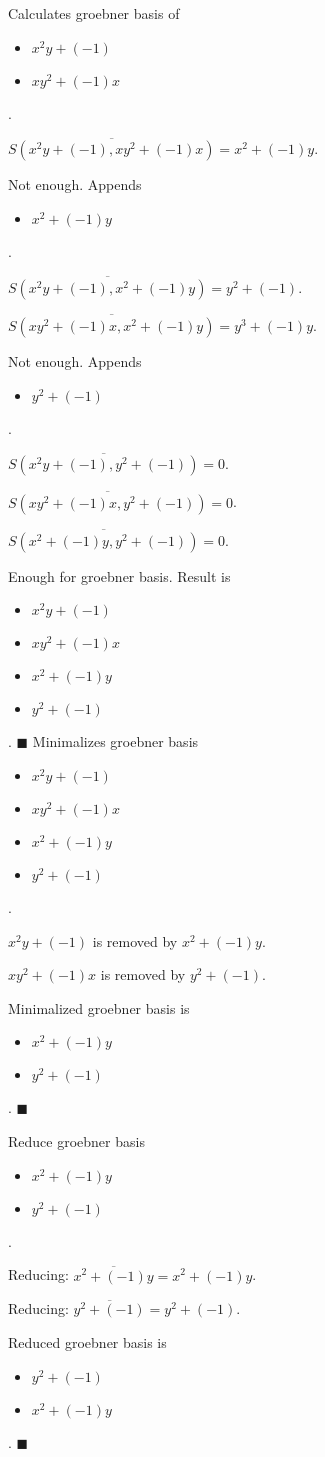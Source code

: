 Calculates groebner basis of
\begin{itemize}
\item $x^{2}y+(-1)$
\item $xy^{2}+(-1)x$
\end{itemize}  .


$\overline{S(x^{2}y+(-1), xy^{2}+(-1)x)} = x^{2}+(-1)y$.

Not enough.  Appends \begin{itemize}
\item $x^{2}+(-1)y$
\end{itemize}  .


$\overline{S(x^{2}y+(-1), x^{2}+(-1)y)} = y^{2}+(-1)$.

$\overline{S(xy^{2}+(-1)x, x^{2}+(-1)y)} = y^{3}+(-1)y$.

Not enough.  Appends \begin{itemize}
\item $y^{2}+(-1)$
\end{itemize}  .


$\overline{S(x^{2}y+(-1), y^{2}+(-1))} = 0$.

$\overline{S(xy^{2}+(-1)x, y^{2}+(-1))} = 0$.

$\overline{S(x^{2}+(-1)y, y^{2}+(-1))} = 0$.

Enough for groebner basis.  Result is \begin{itemize}
\item $x^{2}y+(-1)$
\item $xy^{2}+(-1)x$
\item $x^{2}+(-1)y$
\item $y^{2}+(-1)$
\end{itemize}  .
$\blacksquare{}$
Minimalizes groebner basis
\begin{itemize}
\item $x^{2}y+(-1)$
\item $xy^{2}+(-1)x$
\item $x^{2}+(-1)y$
\item $y^{2}+(-1)$
\end{itemize}  .


$x^{2}y+(-1)$ is removed by $x^{2}+(-1)y$.

$xy^{2}+(-1)x$ is removed by $y^{2}+(-1)$.

Minimalized groebner basis is
\begin{itemize}
\item $x^{2}+(-1)y$
\item $y^{2}+(-1)$
\end{itemize}  .
$\blacksquare{}$

Reduce groebner basis
\begin{itemize}
\item $x^{2}+(-1)y$
\item $y^{2}+(-1)$
\end{itemize}  .


Reducing: $\overline{x^{2}+(-1)y} = x^{2}+(-1)y$.

Reducing: $\overline{y^{2}+(-1)} = y^{2}+(-1)$.

Reduced groebner basis is
\begin{itemize}
\item $y^{2}+(-1)$
\item $x^{2}+(-1)y$
\end{itemize}  .
$\blacksquare{}$
